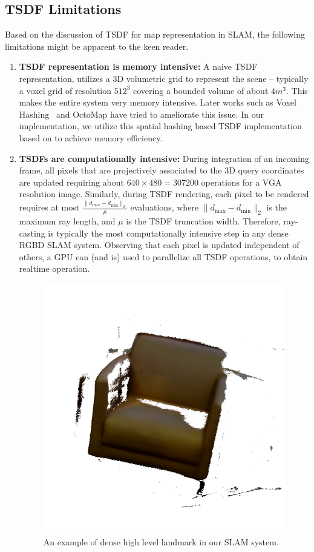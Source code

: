 \subsection{TSDF Limitations}

Based on the discussion of TSDF for map representation in SLAM, the following limitations might be apparent to the keen reader.
\begin{enumerate}
    \item \textbf{TSDF representation is memory intensive:} A naive TSDF representation, utilizes a 3D volumetric grid to represent the scene -- typically  a voxel grid of resolution $512^3$ covering a bounded volume of about $4m^3$. This makes the entire system very memory intensive. Later works such as Voxel Hashing~\cite{niessnerRealtime3DReconstruction2013} and OctoMap \cite{hornungOctoMapEfficientProbabilistic2013} have tried to ameliorate this issue. In our implementation, we utilize this spatial hashing based TSDF implementation based on \cite{dongGPUAcceleratedRobust2019} to achieve memory efficiency.
    \item \textbf{TSDFs are computationally intensive:} During integration of an incoming frame, all pixels that are projectively associated to the 3D query coordinates are updated requiring about $640\times 480 = 307200$ operations for a VGA resolution image. Similarly, during TSDF rendering, each pixel to be rendered requires at most $\frac{\|d_{\max} - d_{\min}\|_2}{\mu}$ evaluations, where $\|d_{\max} - d_{\min}\|_2$ is the maximum ray length, and $\mu$ is the TSDF truncation width. Therefore, ray-casting is typically the most computationally intensive step in any dense RGBD SLAM system. Observing that each pixel is updated independent of others, a GPU can (and is) used to parallelize all TSDF operations, to obtain realtime operation.

\begin{figure}[htpb]
    \centering
    \includegraphics[width=0.4\linewidth]{figs/chair-landmark.png}
    \caption{An example of dense high level landmark in our SLAM system.}%
    \label{fig:chair-landmark}
\end{figure}


\end{enumerate}
